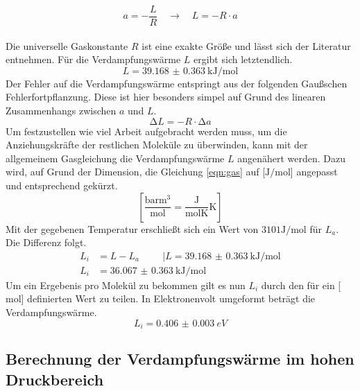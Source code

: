 \begin{equation}
a = -\frac{L}{R} \quad \to \quad L = -R \cdot a
\end{equation}
\\
Die universelle Gaskonstante $R$ ist eine exakte Größe und lässt sich der Literatur \cite{Naturkonstanten} entnehmen.
Für die Verdampfungswärme $L$ ergibt sich letztendlich.
\begin{equation}
L = \SI{39.168(0363)}{\kilo\joule\per\mol}
\end{equation}
Der Fehler auf die Verdampfungswärme entspringt aus der folgenden Gaußschen Fehlerfortpflanzung. Diese ist hier besonders simpel auf Grund des linearen Zusammenhangs zwischen $a$ und $L$. 
\begin{equation}
\increment L = -R \cdot \increment a
\end{equation}
Um festzustellen wie viel Arbeit aufgebracht werden muss, um die Anziehungskräfte der restlichen Moleküle zu überwinden,
kann mit der allgemeinem Gasgleichung die Verdampfungswärme $L$ angenähert werden.
Dazu wird, auf Grund der Dimension, die Gleichung \eqref{eqn:gas} auf [$\si{\joule}/\si{\mol}$] angepasst und entsprechend gekürzt.
\begin{equation}
    \left[\frac{\si{\bar\meter\tothe{3}}}{\si{\mol}}=\frac{\si{\joule}}{\si{\mol\kelvin}}\si{\kelvin}\right]
\end{equation}
Mit der gegebenen Temperatur erschließt sich ein Wert von $3101\si{\joule\per\mol}$ für $L_a$. Die Differenz folgt.
\begin{align*}
    L_i&=L-L_a \hspace{1cm}  | L = \SI{39.168(0363)}{\kilo\joule\per\mol} \\
    L_i&= \SI{36.067(0363)}{\kilo\joule\per\mol}
\end{align*}
Um ein Ergebenis pro Molekül zu bekommen gilt es nun $L_i$ durch den für ein [$\si{\mol}$] definierten Wert zu teilen.
In Elektronenvolt umgeformt beträgt die Verdampfungswärme.
\begin{equation}    
    L_i= \SI{0.406(0003)}{eV}
\end{equation}

\subsection{Berechnung der Verdampfungswärme im hohen Druckbereich}

